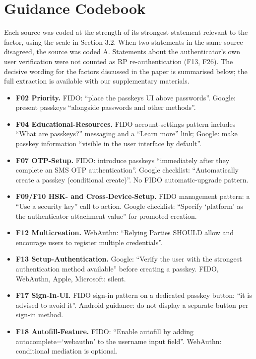 \documentclass[letterpaper,twocolumn,10pt]{article}
\providecommand{\tightlist}{\setlength{\itemsep}{0pt}\setlength{\parskip}{0pt}}
\begin{document}
\appendix

\section{Guidance Codebook}

Each source was coded at the strength of its strongest statement relevant to the factor, using the scale in Section 3.2. When two statements in the same source disagreed, the source was coded A. Statements about the authenticator's own user verification were not counted as RP re-authentication (F13, F26). The decisive wording for the factors discussed in the paper is summarised below; the full extraction is available with our supplementary materials.

\begin{itemize}
\tightlist
\item
  \textbf{F02 Priority.} FIDO: ``place the passkeys UI above passwords''. Google: present passkeys ``alongside passwords and other methods''.
\item
  \textbf{F04 Educational-Resources.} FIDO account-settings pattern includes ``What are passkeys?'' messaging and a ``Learn more'' link; Google: make passkey information ``visible in the user interface by default''.
\item
  \textbf{F07 OTP-Setup.} FIDO: introduce passkeys ``immediately after they complete an SMS OTP authentication''. Google checklist: ``Automatically create a passkey (conditional create)''. No FIDO automatic-upgrade pattern.
\item
  \textbf{F09/F10 HSK- and Cross-Device-Setup.} FIDO management pattern: a ``Use a security key'' call to action. Google checklist: ``Specify `platform' as the authenticator attachment value'' for promoted creation.
\item
  \textbf{F12 Multicreation.} WebAuthn: ``Relying Parties SHOULD allow and encourage users to register multiple credentials''.
\item
  \textbf{F13 Setup-Authentication.} Google: ``Verify the user with the strongest authentication method available'' before creating a passkey. FIDO, WebAuthn, Apple, Microsoft: silent.
\item
  \textbf{F17 Sign-In-UI.} FIDO sign-in pattern on a dedicated passkey button: ``it is advised to avoid it''. Android guidance: do not display a separate button per sign-in method.
\item
  \textbf{F18 Autofill-Feature.} FIDO: ``Enable autofill by adding autocomplete=`webauthn' to the username input field''. WebAuthn: conditional mediation is optional.

\end{itemize}
\end{document}
